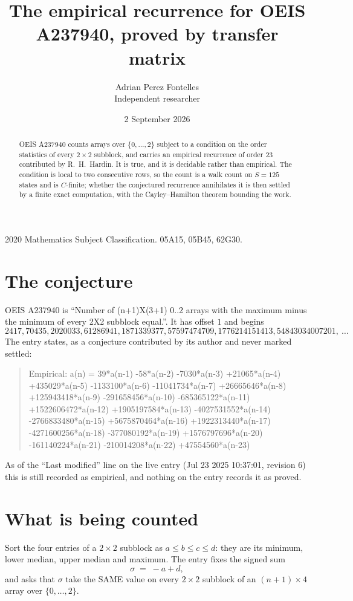 \documentclass[11pt,a4paper]{article}
\title{The empirical recurrence for OEIS A237940, proved by transfer matrix}
\author{Adrian Perez Fontelles\\ \small Independent researcher}
\date{2 September 2026}
\theoremstyle{plain}
\theoremstyle{definition}
\begin{document}
\maketitle

\begin{abstract}
OEIS A237940 counts arrays over $\{0,\dots,2\}$ subject to a condition on the order
statistics of every $2\times2$ subblock, and carries an empirical recurrence of order
$23$ contributed by R.~H.~Hardin. It is true, and it is decidable rather than empirical.
The condition is local to two consecutive rows, so the count is a walk count on $S=125$
states and is $C$-finite; whether the conjectured recurrence annihilates it is then settled by
a finite exact computation, with the Cayley--Hamilton theorem bounding the work.
\end{abstract}

\noindent\small 2020 Mathematics Subject Classification. 05A15, 05B45, 62G30.\normalsize

\section{The conjecture}

OEIS A237940 is ``Number of (n+1)X(3+1) 0..2 arrays with the maximum minus the minimum of every 2X2 subblock equal.''. It has offset $1$ and begins
\[
2417, 70435, 2020033, 61286941, 1871339377, 57597474709, 1776214151413, 54843034007201,\ \dots
\]
The entry states, as a conjecture contributed by its author and never marked settled:
\begin{quote}
Empirical: a(n) = 39*a(n-1) -58*a(n-2) -7030*a(n-3) +21065*a(n-4) +435029*a(n-5) -1133100*a(n-6) -11041734*a(n-7) +26665646*a(n-8) +125943418*a(n-9) -291658456*a(n-10) -685365122*a(n-11) +1522606472*a(n-12) +1905197584*a(n-13) -4027531552*a(n-14) -2766833480*a(n-15) +5675870464*a(n-16) +1922313440*a(n-17) -4271600256*a(n-18) -377080192*a(n-19) +1576797696*a(n-20) -161140224*a(n-21) -210014208*a(n-22) +47554560*a(n-23)
\end{quote}
As of the ``Last modified'' line on the live entry (Jul 23 2025 10:37:01, revision 6) this is still
recorded as empirical, and nothing on the entry records it as proved.

\section{What is being counted}

Sort the four entries of a $2\times2$ subblock as $a\le b\le c\le d$: they
are its minimum, lower median, upper median and maximum. The entry fixes the signed sum
\[
\sigma\;=\;-a+d,
\]
and asks that $\sigma$ take the SAME value on every $2\times2$ subblock of an
$(n+1)\times4$ array over $\{0,\dots,2\}$.
\end{document}
